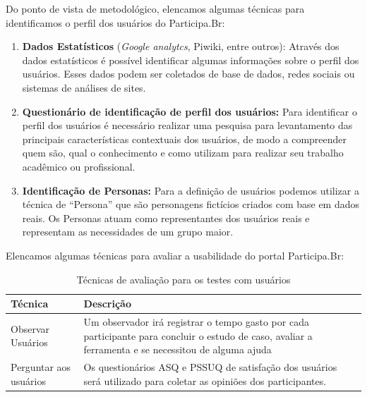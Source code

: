 Do ponto de vista de metodológico, elencamos algumas técnicas para identificamos o perfil dos usuários do Participa.Br:

\begin{enumerate}
\item \textbf{Dados Estatísticos} (\textit{Google analytcs}, Piwiki, entre outros): Através dos dados estatísticos é possível identificar algumas informações sobre o perfil dos usuários. Esses dados podem ser coletados de base de dados, redes sociais ou sistemas de análises de sites.

\item \textbf{Questionário de identificação de perfil dos usuários:} Para identificar o perfil dos usuários é necessário realizar uma pesquisa para levantamento das principais características contextuais dos usuários, de modo a compreender quem são, qual o conhecimento e como utilizam para realizar seu trabalho acadêmico ou profissional. 

\item \textbf{Identificação de Personas:} Para a definição de usuários podemos utilizar a técnica de “Persona” que são personagens fictícios criados com base em dados reais. Os Personas atuam como representantes dos usuários reais e representam as necessidades de um grupo maior. 
\end{enumerate}

Elencamos algumas técnicas para avaliar a usabilidade do portal Participa.Br:

\begin{table}[h]
\begin{tabular}{|l| p{10cm} |}
\hline
Técnica & Descrição \\ \hline
Observar Usuários & Um observador irá registrar o tempo 
gasto por cada participante para concluir o estudo de caso, 
avaliar a ferramenta e se necessitou de alguma ajuda    \\ \hline
Perguntar aos usuários & Os questionários ASQ e PSSUQ 
de satisfação dos usuários será utilizado 
para coletar as opiniões dos participantes.\\ \hline
\end{tabular}
\caption{Técnicas de avaliação para os testes com usuários}
\end{table}

